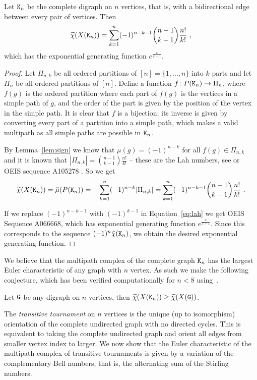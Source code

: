 \documentclass{amsart}
\begin{document}
 
 \begin{thm}\label{thm:complete}
 Let ${\tt K}_n$ be the complete digraph on $n$ vertices, that is, with a bidirectional edge between every pair of vertices. Then  \begin{equation}\label{eq:lah}\widetilde{\chi}(X(\tK_n))=\sum_{k=1}^{n}(-1)^{n-k-1}\binom{n-1}{k-1}\frac{n!}{k!}\ ,\end{equation}
 which has the exponential generating function $e^{\frac{x}{x-1}}$.
 \begin{proof}
 Let $\Pi_{n,k}$ be all ordered partitions of $[n]=\{1,\ldots,n\}$ into $k$ parts and let $\Pi_n$ be all ordered partitions of $[n]$. 
  Define a function $f\colon P({\tt K}_n)\rightarrow\Pi_n$, where $f(g)$ is the ordered partition where each part of $f(g)$ is the vertices in a simple path of $g$, and the order of the part is given by the position of the vertex in the simple path. It is clear that $f$ is a bijection; its inverse is given by converting every part of a partition into a simple path, which makes a valid multipath as all simple paths are possible in ${\tt K}_n$. 
  
  By Lemma~\ref{lem:sign} we know that $\mu(g)=(-1)^{n-k}$ for all $f(g)\in\Pi_{n,k}$ and it is known that $|\Pi_{n,k}|=\binom{n-1}{k-1}\frac{n!}{k!}$ -- these are the Lah numbers, see \cite{Pet07} or OEIS sequence A105278 \cite{OEIS}. So we get
  $$\widetilde{\chi}(X(\tK_n))= \bar{\mu}(P(\tK_n))=-\sum_{k=1}^{n}(-1)^{n-k}|\Pi_{n,k}|=\sum_{k=1}^{n}(-1)^{n-k-1}\binom{n-1}{k-1}\frac{n!}{k!}\ .$$
  
  If we replace $(-1)^{n-k-1}$ with $(-1)^{k-1}$ in Equation~\ref{eq:lah} we get OEIS Sequence A066668, which has exponential generating function $e^{\frac{x}{x+1}}$. 
  Since this corresponds to the sequence $(-1)^n\tilde{\chi}({\tt K}_n)$, we obtain the desired exponential generating function.
 \end{proof}
 \end{thm}
 
 We believe that the multipath complex of the complete graph ${\tt K}_n$ has the largest Euler characteristic of any graph with $n$ vertex. As such we make the following conjecture, which has been verified computationally for $n<8$ using~\cite{pathposet}.
 \begin{conj}
 Let ${\tt G}$ be any digraph on $n$ vertices, then
 $\widetilde{\chi}(X({\tt K}_n))\ge \widetilde{\chi}(X({\tt G}))$.
 \end{conj}
 
 
The \emph{transitive tournament} on $n$ vertices is the unique (up to isomorphism) orientation of the complete undirected graph with no directed cycles. This is equivalent to taking the complete undirected graph and orient all edges from smaller vertex index to larger. We now show that the Euler characteristic of the multipath complex of transitive tournaments is given by a variation of the complementary Bell numbers, that is, the alternating sum of the Stirling numbers.
\end{document}
